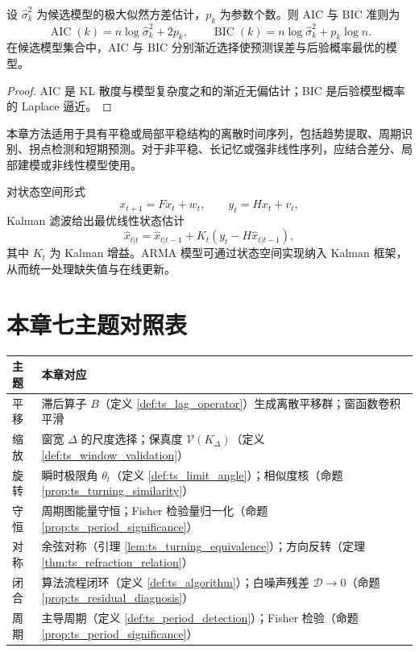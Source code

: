 \begin{theorem}[模型选择准则]\label{thm:ts_model_selection}
设 $\hat\sigma^2_k$ 为候选模型的极大似然方差估计，$p_k$ 为参数个数。则 AIC 与 BIC 准则为
\[
\operatorname{AIC}(k)=n\log\hat\sigma_k^2+2p_k,\qquad
\operatorname{BIC}(k)=n\log\hat\sigma_k^2+p_k\log n.
\]
在候选模型集合中，AIC 与 BIC 分别渐近选择使预测误差与后验概率最优的模型。
\end{theorem}

\begin{proof}
AIC 是 KL 散度与模型复杂度之和的渐近无偏估计；BIC 是后验模型概率的 Laplace 逼近。
\end{proof}

\begin{remark}[适用范围]\label{rem:ts_scope}
本章方法适用于具有平稳或局部平稳结构的离散时间序列，包括趋势提取、周期识别、拐点检测和短期预测。对于非平稳、长记忆或强非线性序列，应结合差分、局部建模或非线性模型使用。
\end{remark}

\begin{remark}\label{rem:ts_kalman_interface}
对状态空间形式
\[
x_{t+1}=Fx_t+w_t,\qquad y_t=Hx_t+v_t,
\]
Kalman 滤波给出最优线性状态估计
\[
\hat x_{t|t}=\hat x_{t|t-1}+K_t(y_t-H\hat x_{t|t-1}),
\]
其中 $K_t$ 为 Kalman 增益。ARMA 模型可通过状态空间实现纳入 Kalman 框架，从而统一处理缺失值与在线更新。
\end{remark}

\section*{本章七主题对照表}

\begin{center}
\renewcommand{\arraystretch}{1.3}
\begin{tabular}{>{\centering\arraybackslash}p{2.2cm}>{\centering\arraybackslash}p{10.5cm}}
\toprule
主题 & 本章对应 \\
\midrule
平移 & 滞后算子 $B$（定义 \ref{def:ts_lag_operator}）生成离散平移群；窗函数卷积平滑 \\
缩放 & 窗宽 $\Delta$ 的尺度选择；保真度 $\mathcal{V}(K_\Delta)$（定义 \ref{def:ts_window_validation}） \\
旋转 & 瞬时极限角 $\theta_t$（定义 \ref{def:ts_limit_angle}）；相似度核（命题 \ref{prop:ts_turning_similarity}） \\
守恒 & 周期图能量守恒；Fisher 检验量归一化（命题 \ref{prop:ts_period_significance}） \\
对称 & 余弦对称（引理 \ref{lem:ts_turning_equivalence}）；方向反转（定理 \ref{thm:ts_refraction_relation}） \\
闭合 & 算法流程闭环（定义 \ref{def:ts_algorithm}）；白噪声残差 $\mathcal{D}\to 0$（命题 \ref{prop:ts_residual_diagnosis}） \\
周期 & 主导周期（定义 \ref{def:ts_period_detection}）；Fisher 检验（命题 \ref{prop:ts_period_significance}） \\
\bottomrule
\end{tabular}
\end{center}


